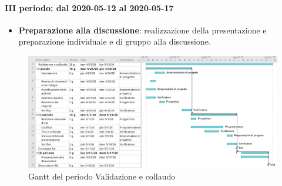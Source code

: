 \paragraph*{III periodo: dal 2020-05-12 al 2020-05-17}
\begin{itemize}
	\item \textbf{Preparazione alla discussione}: realizzazione della presentazione e preparazione individuale e di gruppo alla discussione.
\end{itemize}
\begin{landscape}
	\begin{figure}[H] 	
		\includegraphics[width=\linewidth]{./gantt/Validazione e collaudo.png}	
		\caption{Gantt del periodo Validazione e collaudo}	
	\end{figure}
\end{landscape}
